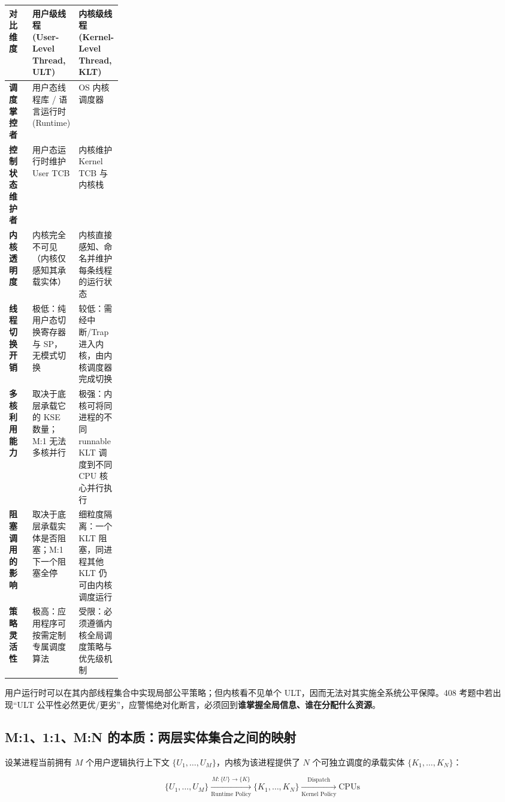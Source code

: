 \documentclass[11pt,a4paper]{ctexart}
\newcommand{\kw}[1]{\textbf{#1}}
\begin{document}
\begingroup
\small
\renewcommand{\arraystretch}{1.25}
\setlength{\tabcolsep}{5pt}
\begin{tabularx}{\linewidth}{>{\bfseries}p{0.22\linewidth} X X}
\toprule
对比维度 & 用户级线程 (User-Level Thread, ULT) & 内核级线程 (Kernel-Level Thread, KLT)\\
\midrule
调度掌控者 & 用户态线程库 / 语言运行时 (Runtime) & OS 内核调度器\\
控制状态维护者 & 用户态运行时维护 User TCB & 内核维护 Kernel TCB 与内核栈\\
内核透明度 & 内核完全不可见（内核仅感知其承载实体） & 内核直接感知、命名并维护每条线程的运行状态\\
线程切换开销 & 极低：纯用户态切换寄存器与 SP，无模式切换 & 较低：需经中断/Trap 进入内核，由内核调度器完成切换\\
多核利用能力 & 取决于底层承载它的 KSE 数量；M:1 无法多核并行 & 极强：内核可将同进程的不同 runnable KLT 调度到不同 CPU 核心并行执行\\
阻塞调用的影响 & 取决于底层承载实体是否阻塞；M:1 下一个阻塞全停 & 细粒度隔离：一个 KLT 阻塞，同进程其他 KLT 仍可由内核调度运行\\
策略灵活性 & 极高：应用程序可按需定制专属调度算法 & 受限：必须遵循内核全局调度策略与优先级机制\\
\bottomrule
\end{tabularx}
\endgroup

\begin{warn}
用户运行时可以在其内部线程集合中实现局部公平策略；但内核看不见单个 ULT，因而无法对其实施全系统公平保障。408 考题中若出现“ULT 公平性必然更优/更劣”，应警惕绝对化断言，必须回到\kw{谁掌握全局信息、谁在分配什么资源}。
\end{warn}

\subsection{M:1、1:1、M:N 的本质：两层实体集合之间的映射}

设某进程当前拥有 $M$ 个用户逻辑执行上下文 $\{U_1,\dots,U_M\}$，内核为该进程提供了 $N$ 个可独立调度的承载实体 $\{K_1,\dots,K_N\}$：

\[
\boxed{
\{U_1,\dots,U_M\}
\xrightarrow[\text{Runtime Policy}]{M: \{U\} \to \{K\}}
\{K_1,\dots,K_N\}
\xrightarrow[\text{Kernel Policy}]{\text{Dispatch}}
\text{CPUs}
}
\]
\end{document}
